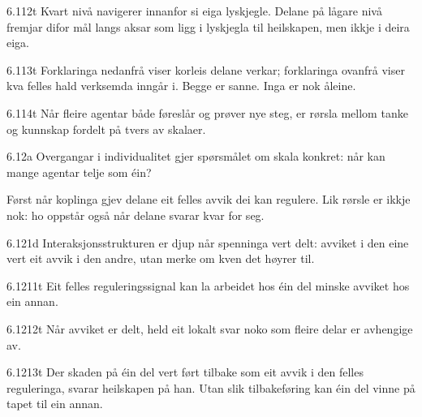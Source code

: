 \begin{formproposition}{6.112}{t}
Kvart nivå navigerer innanfor si eiga lyskjegle. Delane på lågare nivå fremjar difor mål langs aksar som ligg i lyskjegla til heilskapen, men ikkje i deira eiga.
\end{formproposition}

\begin{formproposition}{6.113}{t}
Forklaringa nedanfrå viser korleis delane verkar; forklaringa ovanfrå viser kva felles hald verksemda inngår i. Begge er sanne. Inga er nok åleine.
\end{formproposition}

\begin{formproposition}{6.114}{t}
Når fleire agentar både føreslår og prøver nye steg, er rørsla mellom tanke og kunnskap fordelt på tvers av skalaer.
\end{formproposition}

\begin{formproposition}{6.12}{a}
Overgangar i individualitet gjer spørsmålet om skala konkret: når kan mange agentar telje som éin?

Først når koplinga gjev delane eit felles avvik dei kan regulere. Lik rørsle er ikkje nok: ho oppstår også når delane svarar kvar for seg.
\end{formproposition}

\begin{formproposition}{6.121}{d}
Interaksjonsstrukturen er djup når spenninga vert delt: avviket i den eine vert eit avvik i den andre, utan merke om kven det høyrer til.
\end{formproposition}

\begin{formproposition}{6.1211}{t}
Eit felles reguleringssignal kan la arbeidet hos éin del minske avviket hos ein annan.
\end{formproposition}

\begin{formproposition}{6.1212}{t}
Når avviket er delt, held eit lokalt svar noko som fleire delar er avhengige av.
\end{formproposition}

\begin{formproposition}{6.1213}{t}
Der skaden på éin del vert ført tilbake som eit avvik i den felles reguleringa, svarar heilskapen på han. Utan slik tilbakeføring kan éin del vinne på tapet til ein annan.
\end{formproposition}

